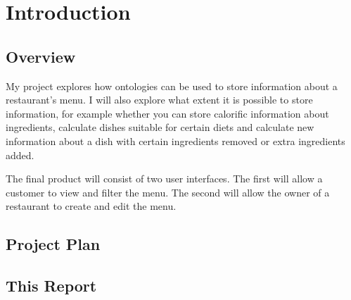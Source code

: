 \chapter{Introduction}

\section{Overview}

My project explores how ontologies can be used to store information about a restaurant's menu. 
I will also explore what extent it is possible to store information, for example whether you can store calorific information about ingredients, calculate dishes suitable for certain diets and calculate new information about a dish with certain ingredients removed or extra ingredients added.

The final product will consist of two user interfaces. The first will allow a customer to view and filter the menu. The second will allow the owner of a restaurant to create and edit the menu.

\section{Project Plan}

\section{This Report}



